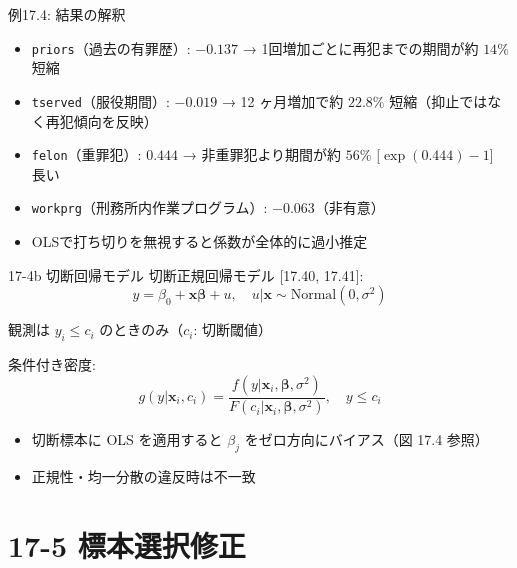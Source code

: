 \documentclass[
  ignorenonframetext,
]{beamer}
\providecommand{\tightlist}{%
  \setlength{\itemsep}{0pt}\setlength{\parskip}{0pt}}
\begin{document}
\begin{frame}[fragile]{例17.4: 結果の解釈}
\protect\hypertarget{ux4f8b17.4-ux7d50ux679cux306eux89e3ux91c8}{}
\begin{itemize}
\tightlist
\item
  \texttt{priors}（過去の有罪歴）: \(-0.137\) →
  1回増加ごとに再犯までの期間が約 \(14\%\) 短縮
\item
  \texttt{tserved}（服役期間）: \(-0.019\) → 12 ヶ月増加で約 \(22.8\%\)
  短縮（抑止ではなく再犯傾向を反映）
\item
  \texttt{felon}（重罪犯）: \(0.444\) → 非重罪犯より期間が約 \(56\%\)
  {[}\(\exp(0.444)-1\){]} 長い
\item
  \texttt{workprg}（刑務所内作業プログラム）: \(-0.063\)（非有意）
\item
  OLSで打ち切りを無視すると係数が全体的に過小推定
\end{itemize}
\end{frame}

\begin{frame}{17-4b 切断回帰モデル}
\protect\hypertarget{b-ux5207ux65adux56deux5e30ux30e2ux30c7ux30eb}{}
切断正規回帰モデル {[}17.40, 17.41{]}:
\[y = \beta_0 + \mathbf{x\beta} + u, \quad u|\mathbf{x} \sim \text{Normal}(0, \sigma^2)\]

観測は \(y_i \leq c_i\) のときのみ（\(c_i\): 切断閾値）

条件付き密度:
\[g(y|\mathbf{x}_i, c_i) = \frac{f(y|\mathbf{x}_i, \boldsymbol{\beta}, \sigma^2)}{F(c_i|\mathbf{x}_i, \boldsymbol{\beta}, \sigma^2)}, \quad y \leq c_i\]

\begin{itemize}
\tightlist
\item
  切断標本に OLS を適用すると \(\beta_j\) をゼロ方向にバイアス（図 17.4
  参照）
\item
  正規性・均一分散の違反時は不一致
\end{itemize}
\end{frame}

\hypertarget{ux6a19ux672cux9078ux629eux4feeux6b63}{%
\section{17-5 標本選択修正}\label{ux6a19ux672cux9078ux629eux4feeux6b63}}
\end{document}
